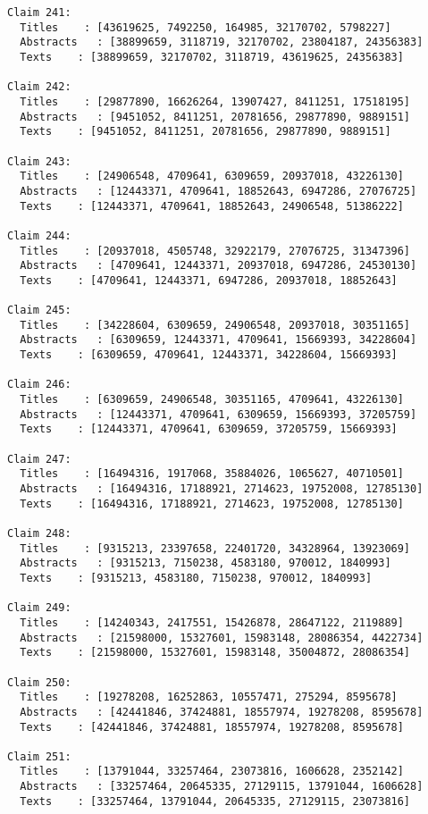 \documentclass[11pt]{article}
\begin{document}
\begin{Verbatim}[commandchars=\\\{\}]
Claim 241:
  Titles    : [43619625, 7492250, 164985, 32170702, 5798227]
  Abstracts   : [38899659, 3118719, 32170702, 23804187, 24356383]
  Texts    : [38899659, 32170702, 3118719, 43619625, 24356383]

Claim 242:
  Titles    : [29877890, 16626264, 13907427, 8411251, 17518195]
  Abstracts   : [9451052, 8411251, 20781656, 29877890, 9889151]
  Texts    : [9451052, 8411251, 20781656, 29877890, 9889151]

Claim 243:
  Titles    : [24906548, 4709641, 6309659, 20937018, 43226130]
  Abstracts   : [12443371, 4709641, 18852643, 6947286, 27076725]
  Texts    : [12443371, 4709641, 18852643, 24906548, 51386222]

Claim 244:
  Titles    : [20937018, 4505748, 32922179, 27076725, 31347396]
  Abstracts   : [4709641, 12443371, 20937018, 6947286, 24530130]
  Texts    : [4709641, 12443371, 6947286, 20937018, 18852643]

Claim 245:
  Titles    : [34228604, 6309659, 24906548, 20937018, 30351165]
  Abstracts   : [6309659, 12443371, 4709641, 15669393, 34228604]
  Texts    : [6309659, 4709641, 12443371, 34228604, 15669393]

Claim 246:
  Titles    : [6309659, 24906548, 30351165, 4709641, 43226130]
  Abstracts   : [12443371, 4709641, 6309659, 15669393, 37205759]
  Texts    : [12443371, 4709641, 6309659, 37205759, 15669393]

Claim 247:
  Titles    : [16494316, 1917068, 35884026, 1065627, 40710501]
  Abstracts   : [16494316, 17188921, 2714623, 19752008, 12785130]
  Texts    : [16494316, 17188921, 2714623, 19752008, 12785130]

Claim 248:
  Titles    : [9315213, 23397658, 22401720, 34328964, 13923069]
  Abstracts   : [9315213, 7150238, 4583180, 970012, 1840993]
  Texts    : [9315213, 4583180, 7150238, 970012, 1840993]

Claim 249:
  Titles    : [14240343, 2417551, 15426878, 28647122, 2119889]
  Abstracts   : [21598000, 15327601, 15983148, 28086354, 4422734]
  Texts    : [21598000, 15327601, 15983148, 35004872, 28086354]

Claim 250:
  Titles    : [19278208, 16252863, 10557471, 275294, 8595678]
  Abstracts   : [42441846, 37424881, 18557974, 19278208, 8595678]
  Texts    : [42441846, 37424881, 18557974, 19278208, 8595678]

Claim 251:
  Titles    : [13791044, 33257464, 23073816, 1606628, 2352142]
  Abstracts   : [33257464, 20645335, 27129115, 13791044, 1606628]
  Texts    : [33257464, 13791044, 20645335, 27129115, 23073816]


\end{Verbatim}
\end{document}

